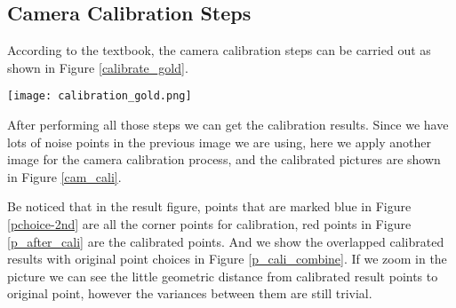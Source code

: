 \documentclass[conference]{IEEEtran}
\begin{document}
\subsection{Camera Calibration Steps}
According to the textbook, the camera calibration steps can be carried out as shown in Figure \ref{calibrate_gold}.
\begin{figure*}
  \centering \texttt{[image: calibration\_gold.png]}
  \caption{Algorithm of Camera Calibration using Gold Standard}
  \label{calibrate_gold}
\end{figure*}

After performing all those steps we can get the calibration results. Since we have lots of noise points in the previous image we are using, here we apply another image for the camera calibration process, and the calibrated pictures are shown in Figure \ref{cam_cali}.
\begin{figure*}[!hbpt]
  \caption{Camera Calibration Results}
  \label{cam_cali} %
\end{figure*}

Be noticed that in the result figure, points that are marked blue in Figure \ref{pchoice-2nd} are all the corner points for calibration, red points in Figure \ref{p_after_cali} are the calibrated points. And we show the overlapped calibrated results with original point choices in Figure \ref{p_cali_combine}. If we zoom in the picture we can see the little geometric distance from calibrated result points to original point, however the variances between them are still trivial.
\end{document}
